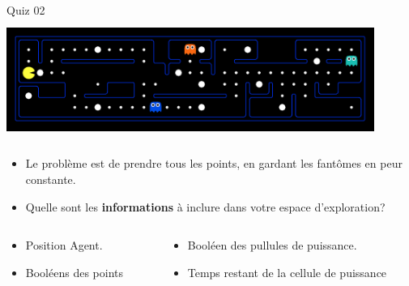 \documentclass{beamer}
\begin{document}
\begin{frame}[t]{Quiz 02 }
 \centering 
 \includegraphics[width=0.9\textwidth, height=4cm]{./images/quiz_pacman_01.png}
 \begin{itemize}
   \item Le problème est de prendre tous les points, en gardant les fantômes en
     peur constante.
   \item Quelle sont les \alert{\textbf{informations}} à inclure dans votre
     espace d'exploration?
 \end{itemize}

 \pause
 \begin{columns}
   \begin{column}{0.5\textwidth}
     \begin{itemize}
       \scriptsize
       \item  Position Agent.
       \item Booléens des points
     \end{itemize}
   \end{column}
   \begin{column}{0.5\textwidth}
     \begin{itemize}
       \scriptsize
       \item Booléen des pullules de puissance.
         \item Temps restant de la cellule de puissance
     \end{itemize} 
   \end{column}
 \end{columns}
\end{frame}
\end{document}
